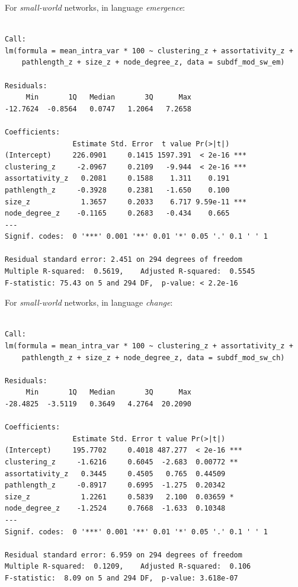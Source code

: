 \documentclass[
]{article}
\begin{document}
For \emph{small-world} networks, in language \emph{emergence}:

\begin{verbatim}

Call:
lm(formula = mean_intra_var * 100 ~ clustering_z + assortativity_z + 
    pathlength_z + size_z + node_degree_z, data = subdf_mod_sw_em)

Residuals:
     Min       1Q   Median       3Q      Max 
-12.7624  -0.8564   0.0747   1.2064   7.2658 

Coefficients:
                Estimate Std. Error  t value Pr(>|t|)    
(Intercept)     226.0901     0.1415 1597.391  < 2e-16 ***
clustering_z     -2.0967     0.2109   -9.944  < 2e-16 ***
assortativity_z   0.2081     0.1588    1.311    0.191    
pathlength_z     -0.3928     0.2381   -1.650    0.100    
size_z            1.3657     0.2033    6.717 9.59e-11 ***
node_degree_z    -0.1165     0.2683   -0.434    0.665    
---
Signif. codes:  0 '***' 0.001 '**' 0.01 '*' 0.05 '.' 0.1 ' ' 1

Residual standard error: 2.451 on 294 degrees of freedom
Multiple R-squared:  0.5619,    Adjusted R-squared:  0.5545 
F-statistic: 75.43 on 5 and 294 DF,  p-value: < 2.2e-16
\end{verbatim}

For \emph{small-world} networks, in language \emph{change}:

\begin{verbatim}

Call:
lm(formula = mean_intra_var * 100 ~ clustering_z + assortativity_z + 
    pathlength_z + size_z + node_degree_z, data = subdf_mod_sw_ch)

Residuals:
     Min       1Q   Median       3Q      Max 
-28.4825  -3.5119   0.3649   4.2764  20.2090 

Coefficients:
                Estimate Std. Error t value Pr(>|t|)    
(Intercept)     195.7702     0.4018 487.277  < 2e-16 ***
clustering_z     -1.6216     0.6045  -2.683  0.00772 ** 
assortativity_z   0.3445     0.4505   0.765  0.44509    
pathlength_z     -0.8917     0.6995  -1.275  0.20342    
size_z            1.2261     0.5839   2.100  0.03659 *  
node_degree_z    -1.2524     0.7668  -1.633  0.10348    
---
Signif. codes:  0 '***' 0.001 '**' 0.01 '*' 0.05 '.' 0.1 ' ' 1

Residual standard error: 6.959 on 294 degrees of freedom
Multiple R-squared:  0.1209,    Adjusted R-squared:  0.106 
F-statistic:  8.09 on 5 and 294 DF,  p-value: 3.618e-07
\end{verbatim}
\end{document}
